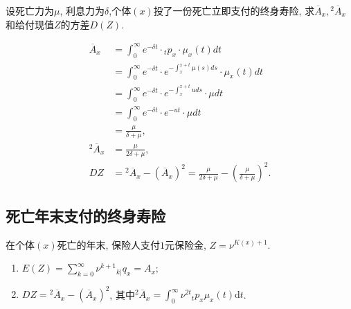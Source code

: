\documentclass[lang=cn,10pt]{elegantbook}
\begin{document}
\begin{example}
    设死亡力为$\mu$, 利息力为$\delta$,个体$(x)$投了一份死亡立即支付的终身寿险, 求$\overline{A}_{x}, {}^2\overline{A}_{x} $和给付现值$Z$的方差$D(Z)$.
\end{example}
\begin{solution}
    \begin{align*}
        \overline{A}_{x} & =\int_0^{\infty}e^{-\delta t}\cdot {}_tp_x\cdot \mu_x(t)dt                                       \\
                         & =\int_0^{\infty}e^{-\delta t}\cdot e^{-\int_x^{x+t}\mu(s)ds}\cdot \mu_x(t)dt                     \\
                         & =\int_0^{\infty}e^{-\delta t}\cdot e^{-\int_x^{x+t}uds}\cdot \mu dt                              \\
                         & =\int_0^{\infty}e^{-\delta t}\cdot e^{-ut}\cdot \mu dt                                           \\
                         & =\frac{\mu}{\delta +\mu},                                                                        \\
        {}^2\overline{A}_{x}
                         & =\frac{\mu}{2\delta +\mu},                                                                       \\
        DZ               & ={}^2\overline{A}_{x}-(\overline{A}_{x})^2=\frac{\mu}{2\delta +\mu}-(\frac{\mu}{\delta +\mu})^2.
    \end{align*}
\end{solution}

\subsection{死亡年末支付的终身寿险}
\begin{definition}[支付现值]
    在个体$(x)$死亡的年末, 保险人支付$1$元保险金, $Z=\nu^{K(x)+1}$.
\end{definition}

\begin{proposition}[精算现值与方差]
    \begin{enumerate}
        \item $E(Z) = \sum_{k=0}^{\infty }{\nu^{k+1}{}_{k|}q_x} = A_x;$
        \item $DZ = {}^2\overline{A}_x - (\overline{A}_x)^2$, 其中${}^2\overline{A}_x = \int_0^\infty \nu^{2t}{}_tp_x\mu_x(t)\mathrm{d}t$.
    \end{enumerate}
\end{proposition}
\end{document}
